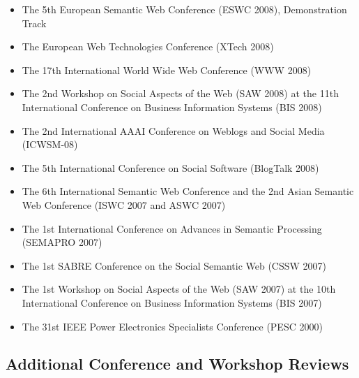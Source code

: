 \documentclass[10pt,a4paper]{res} %
\begin{document}
\begin{resume}
\begin{itemize}
\item The 5th European Semantic Web Conference (ESWC 2008), Demonstration Track
\item The European Web Technologies Conference (XTech 2008)
\item The 17th International World Wide Web Conference (WWW 2008)
\item The 2nd Workshop on Social Aspects of the Web (SAW 2008) at the 11th International Conference on Business Information Systems (BIS 2008)
\item The 2nd International AAAI Conference on Weblogs and Social Media (ICWSM-08)
\item The 5th International Conference on Social Software (BlogTalk 2008)
\item The 6th International Semantic Web Conference and the 2nd Asian Semantic Web Conference (ISWC 2007 and ASWC 2007)
\item The 1st International Conference on Advances in Semantic Processing (SEMAPRO 2007)
\item The 1st SABRE Conference on the Social Semantic Web (CSSW 2007)
\item The 1st Workshop on Social Aspects of the Web (SAW 2007) at the 10th International Conference on Business Information Systems (BIS 2007)
\item The 31st IEEE Power Electronics Specialists Conference (PESC 2000)
\end{itemize}

\subsection*{Additional Conference and Workshop Reviews}


\end{resume}
\end{document}
